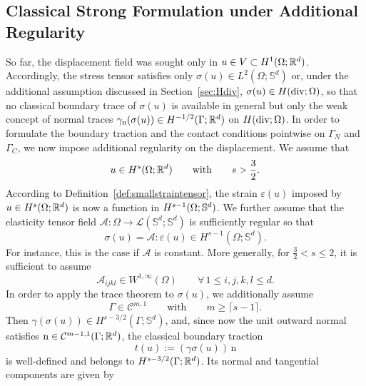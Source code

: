 \subsection{Classical Strong Formulation under Additional Regularity}\label{sec:classical}

So far, the displacement field was sought only in $u\in V\subset H^1(\Omega;\R^d)$. Accordingly, the stress tensor satisfies only $\sigma(u)\in L^2(\Omega;\mathbb S^d)$ or, under the additional assumption discussed in Section~\ref{sec:Hdiv}, $\sigma(u)\in H(\diver;\Omega)$, so that no classical boundary trace of $\sigma(u)$ is available in general but only the weak concept of normal traces $\gamma_{\mathrm{n}}(\sigma(u))\in H^{-1/2}(\Gamma;\R^d)$ on $H(\diver;\Omega)$. In order to formulate the boundary traction and the contact conditions pointwise on $\Gamma_N$ and $\Gamma_C$, we now impose additional regularity on the displacement. We assume that
\begin{equation*}
	u\in H^s(\Omega;\R^d)
	\qquad\text{with}\qquad
	s>\frac32.
\end{equation*}
According to Definition~\ref{def:smallstraintensor}, the strain $\varepsilon(u)$ imposed by $u\in H^s(\Omega;\R^d)$ is now a function in $H^{s-1}(\Omega;\S^d)$. We further assume that the elasticity tensor field $\mathcal A:\Omega\to\mathcal L(\mathbb S^d;\mathbb S^d)$ is sufficiently regular so that
\begin{equation*}
	\sigma(u)=\mathcal A:\varepsilon(u)\in H^{s-1}(\Omega;\mathbb S^d).
\end{equation*}
For instance, this is the case if $\mathcal A$ is constant. More generally, for $\frac32<s\le 2$, it is sufficient to assume
\begin{equation*}
	\mathcal A_{ijkl}\in W^{1,\infty}(\Omega)
	\qquad\forall\,1\le i,j,k,l\le d.
\end{equation*}
In order to apply the trace theorem to $\sigma(u)$, we additionally assume
\begin{equation*}
	\Gamma\in \mathcal C^{m,1}
	\qquad\text{with}\qquad
	m\ge \lceil s-1\rceil.
\end{equation*}
Then $\gamma(\sigma(u))\in H^{s-3/2}(\Gamma;\mathbb S^d)$, and, since now the unit outward normal satisfies $\mathrm{n}\in \mathcal C^{m-1,1}(\Gamma;\R^d)$, the classical boundary traction
\begin{equation*}
	t(u):=(\gamma\sigma(u))\,\mathrm{n}
\end{equation*}
is well-defined and belongs to $H^{s-3/2}(\Gamma;\R^d)$. Its normal and tangential components are given by
